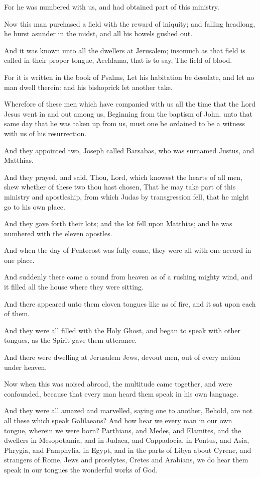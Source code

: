 \Verse For he was numbered with us, and had obtained part of this ministry.

\Verse Now this man purchased a field with the reward of iniquity; and falling headlong, he burst asunder in the midst, and all his bowels gushed out.

\Verse And it was known unto all the dwellers at Jerusalem; insomuch as that field is called in their proper tongue, Aceldama, that is to say, The field of blood.

\Verse For it is written in the book of Psalms, Let his habitation be desolate, and let no man dwell therein: and his bishoprick let another take.

\Verse Wherefore of these men which have companied with us all the time that the Lord Jesus went in and out among us, \Verse Beginning from the baptism of John, unto that same day that he was taken up from us, must one be ordained to be a witness with us of his resurrection.

\Verse And they appointed two, Joseph called Barsabas, who was surnamed Justus, and Matthias.

\Verse And they prayed, and said, Thou, Lord, which knowest the hearts of all men, shew whether of these two thou hast chosen, \Verse That he may take part of this ministry and apostleship, from which Judas by transgression fell, that he might go to his own place.

\Verse And they gave forth their lots; and the lot fell upon Matthias; and he was numbered with the eleven apostles.


\Chapter
\Verse And when the day of Pentecost was fully come, they were all with one accord in one place.

\Verse And suddenly there came a sound from heaven as of a rushing mighty wind, and it filled all the house where they were sitting.

\Verse And there appeared unto them cloven tongues like as of fire, and it sat upon each of them.

\Verse And they were all filled with the Holy Ghost, and began to speak with other tongues, as the Spirit gave them utterance.

\Verse And there were dwelling at Jerusalem Jews, devout men, out of every nation under heaven.

\Verse Now when this was noised abroad, the multitude came together, and were confounded, because that every man heard them speak in his own language.

\Verse And they were all amazed and marvelled, saying one to another, Behold, are not all these which speak Galilaeans?  \Verse And how hear we every man in our own tongue, wherein we were born?  \Verse Parthians, and Medes, and Elamites, and the dwellers in Mesopotamia, and in Judaea, and Cappadocia, in Pontus, and Asia, \Verse Phrygia, and Pamphylia, in Egypt, and in the parts of Libya about Cyrene, and strangers of Rome, Jews and proselytes, \Verse Cretes and Arabians, we do hear them speak in our tongues the wonderful works of God.


